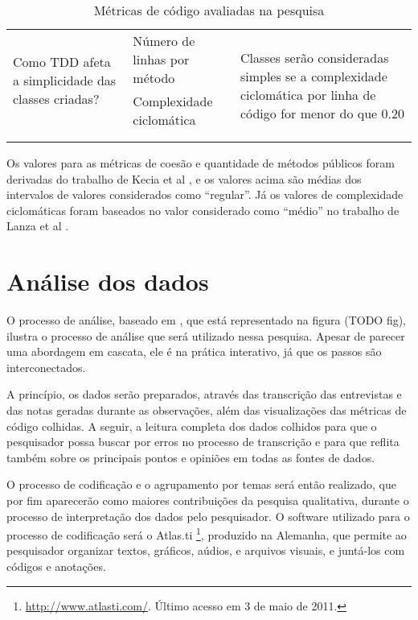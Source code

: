 \begin{table}
\begin{tabular}{ | p{5cm} | p{5cm} | p{5cm} | }
		\multirow{2}{5cm}{Como TDD afeta a simplicidade das classes criadas?}
		& Número de linhas por método & 
		\multirow{4}{5cm}{Classes serão consideradas simples se a complexidade
		ciclomática por linha de código for menor do que 0.20 } \\
		& Complexidade ciclomática & \\
		& & \\ & & \\
		
		\hline
	\end{tabular}
	\label{tab:metricas}
	\caption{Métricas de código avaliadas na pesquisa}
\end{table}

Os valores para as métricas de coesão e quantidade de métodos públicos foram
derivadas do trabalho de Kecia et al \cite{kecia}, e os valores acima são médias
dos intervalos de valores considerados como ``regular''. Já os valores de
complexidade ciclomáticas foram baseados no valor considerado como ``médio'' no
trabalho de Lanza et al \cite{lanza}.

\section{Análise dos dados}
\label{sec:planejamento-analise}

O processo de análise, baseado em \cite{creswell}, que está representado na
figura (TODO fig), ilustra o processo de análise que será utilizado nessa
pesquisa. Apesar de parecer uma abordagem em cascata, ele é na prática 
interativo, já que os passos são interconectados. 

A princípio, os dados serão preparados, através das transcrição das
entrevistas e das notas geradas durante as observações, além das
visualizações das métricas de código colhidas. A seguir, a leitura completa dos
dados colhidos para que o pesquisador possa buscar por erros no processo de
transcrição e para que reflita também sobre os principais pontos e opiniões em
todas as fontes de dados.

O processo de codificação e o agrupamento
por temas será então realizado, que por fim aparecerão como maiores
contribuições da pesquisa qualitativa, durante o processo de interpretação dos
dados pelo pesquisador. O software utilizado para o processo de codificação será
o Atlas.ti \footnote{\url{http://www.atlasti.com/}. Último acesso em 3 de maio
de 2011.}, produzido na Alemanha, que permite ao pesquisador organizar textos,
gráficos, aúdios, e arquivos visuais, e juntá-los com códigos e anotações. 

